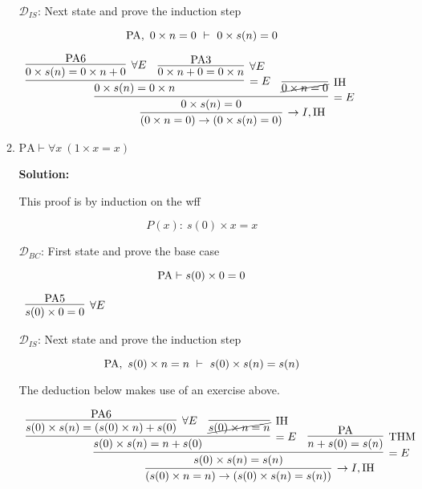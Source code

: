 \documentclass[11pt]{report}
\begin{document}
\begin{enumerate}
\begin{enumerate}
		$\mathcal{D}_{IS}$: Next state and prove the induction step

		$$ \text{PA}, \ 0 \times n = 0 \ \vdash \ 0 \times s(n) = 0$$

		\begin{mdframed}
			\begin{center}
				$\begin{array}{c}
					\infer[\to I, \IH]{(0 \times n = 0) \to (0 \times s(n) = 0)}
						{\infer[=E]{0 \times s(n) = 0}
							{\infer[=E]{0 \times s(n) = 0 \times n}
								{\infer[\forall E]{0 \times s(n) = 0 \times n + 0}{\PA 6}
								&
								\infer[\forall E]{0 \times n + 0 = 0\times n}{\PA 3}}
							&
							\infer[\IH]{\cancel{0 \times n = 0}}{}}}
				\end{array}$
			\end{center}
		\end{mdframed}
		
		\newpage
		\item $\text{PA} \vdash \forall x \ (1 \times x = x)$

		{\bf Solution:} 

		This proof is by induction on the wff 

		$$ P(x) : \ s(0) \times x = x$$

		$\mathcal{D}_{BC}$: First state and prove the base case 

		$$ \text{PA} \vdash s(0) \times 0 = 0$$

		\begin{mdframed}
			\begin{center}
				$\begin{array}{c}
					\infer[\forall E]{s(0)\times 0 = 0}
						{\PA 5}
				\end{array}$
			\end{center}
		\end{mdframed}

		$\mathcal{D}_{IS}$: Next state and prove the induction step

		$$ \PA, \ s(0)\times n = n \ \vdash \ s(0)\times s(n) = s(n)$$

		The deduction below makes use of an exercise above. 

		\begin{mdframed}
			\begin{center}
				\footnotesize{$\begin{array}{c}
					\infer[\to I, \IH]{(s(0)\times n = n) \to (s(0)\times s(n) = s(n))}
						{\infer[=E]{s(0)\times s(n) = s(n)}
							{\infer[=E]{s(0)\times s(n) = n + s(0)}
								{\infer[\forall E]{s(0)\times s(n)= (s(0)\times n) + s(0)}{\PA 6}
								&
								\infer[\IH]{\cancel{s(0)\times n = n}}{}}
							&
							\infer[\THM]{n + s(0) = s(n)}{\PA}}}
				\end{array}$}
			\end{center}
		\end{mdframed}
		

\end{enumerate}
\end{enumerate}
\end{document}

